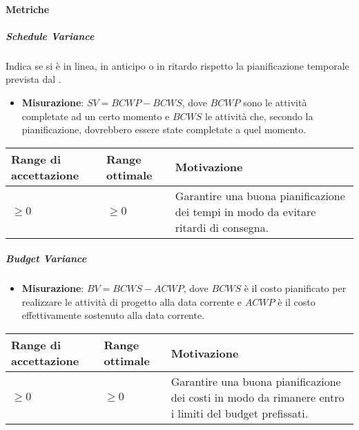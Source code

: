 \paragraph{Metriche}

\subparagraph{Schedule Variance}
Indica se si è in linea, in anticipo o in ritardo rispetto la pianificazione temporale prevista dal \PdP.

\begin{itemize}
\item \textbf{Misurazione}: $SV = BCWP - BCWS$, dove $BCWP$ sono le attività completate ad un certo momento e $BCWS$ le attività che, secondo la pianificazione, dovrebbero essere state completate a quel momento.
\end{itemize}

\begin{center}

		\begin{tabular}{|P{2.5cm}|P{2.5cm}|P{6cm}|}
		\hline
			\textbf{Range di accettazione}	& \textbf{Range ottimale} & \textbf{Motivazione} \\
			\hline
			$\geq 0$ & $\geq 0$ & Garantire una buona pianificazione dei tempi in modo da evitare ritardi di consegna. \\
			\hline
			\end{tabular}
\end{center}


\subparagraph{Budget Variance}

\begin{itemize}
\item \textbf{Misurazione}: $BV = BCWS - ACWP$, dove $BCWS$ è il costo pianificato per realizzare le attività di progetto alla data corrente e $ACWP$ è il costo effettivamente sostenuto alla data corrente.
\end{itemize}

\begin{center}
	\begin{tabular}{|P{2.5cm}|P{2.5cm}|P{6cm}|}
		\hline
			\textbf{Range di accettazione}	& \textbf{Range ottimale} & \textbf{Motivazione} \\
			\hline
			$\geq 0$ & $\geq 0$ & Garantire una buona pianificazione dei costi in modo da rimanere entro i limiti del budget prefissati. \\
			\hline
			\end{tabular}
\end{center}

